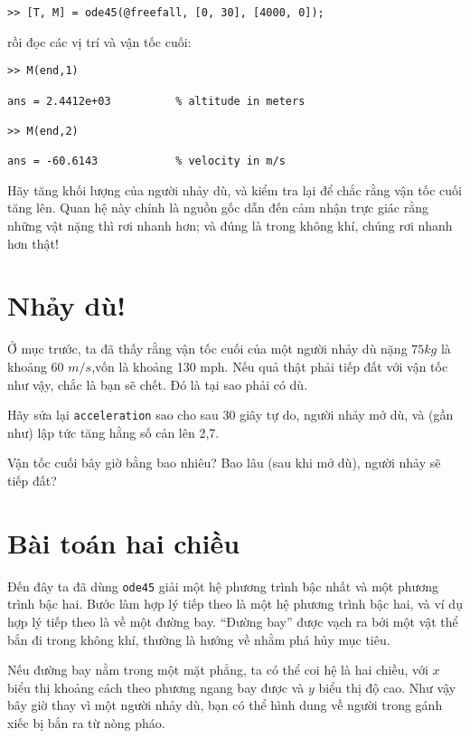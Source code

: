 \documentclass[12pt]{book}
\begin{document}
\begin{verbatim}
>> [T, M] = ode45(@freefall, [0, 30], [4000, 0]);
\end{verbatim}
%
\noindent rồi đọc các vị trí và vận tốc cuối:

\begin{verbatim}
>> M(end,1)

ans = 2.4412e+03          % altitude in meters

>> M(end,2)

ans = -60.6143            % velocity in m/s
\end{verbatim}
%
\begin{ex}
Hãy tăng khối lượng của người nhảy dù, và kiểm tra lại để chắc
rằng vận tốc cuối tăng lên. Quan hệ này chính là nguồn gốc dẫn đến
cảm nhận trực giác rằng những vật nặng thì rơi nhanh hơn; và
đúng là trong không khí, chúng rơi nhanh hơn thật!
\end{ex}


\section{Nhảy dù!}

Ở mục trước, ta đã thấy rằng vận tốc cuối của một người nhảy dù
nặng $75 kg$ là khoảng 60 $m/s$,vốn là khoảng 130 mph. Nếu 
quả thật phải tiếp đất với vận tốc như vậy, chắc là bạn sẽ chết. 
Đó là tại sao phải có dù.

\begin{ex}
Hãy sửa lại {\tt acceleration} sao cho sau 30 giây tự do, người nhảy
mở dù, và (gần như) lập tức tăng hằng số cản lên 2,7.

Vận tốc cuối bây giờ bằng bao nhiêu? Bao lâu (sau khi mở dù), người
nhảy sẽ tiếp đất?
\end{ex}


\section{Bài toán hai chiều}
\label{projectile}

Đến đây ta đã dùng {\tt ode45} giải một hệ phương trình bậc nhất
và một phương trình bậc hai. Bước làm hợp lý tiếp theo là một 
hệ phương trình bậc hai, và ví dụ hợp lý tiếp theo là về một đường bay.
``Đường bay'' được vạch ra bởi một vật thể bắn đi trong không khí,
thường là hướng về nhằm phá hủy mục tiêu.

Nếu đường bay nằm trong một mặt phẳng, ta có thể coi hệ là
hai chiều, với $x$ biểu thị khoảng cách theo phương ngang bay được
và $y$ biểu thị độ cao. Như vậy bây giờ thay vì một người nhảy dù,
bạn có thể hình dung về người trong gánh xiếc bị bắn ra từ nòng pháo.
\end{document}
